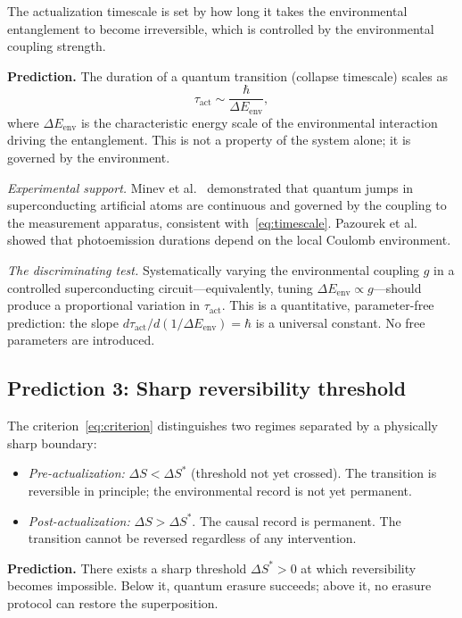 \documentclass[11pt,twocolumn]{article}
\newcommand{\tauact}{\tau_{\mathrm{act}}}
\begin{document}
The actualization timescale is set by how long it takes the
environmental entanglement to become irreversible, which is
controlled by the environmental coupling strength.

\textbf{Prediction.}
The duration of a quantum transition (collapse timescale)
scales as
\begin{equation}
  \tauact \sim \frac{\hbar}{\Delta E_{\mathrm{env}}},
  \label{eq:timescale}
\end{equation}
where $\Delta E_{\mathrm{env}}$ is the characteristic energy
scale of the environmental interaction driving the entanglement.
This is not a property of the system alone; it is governed by
the environment.

\emph{Experimental support.}
Minev et al.~\cite{Minev2019} demonstrated that quantum jumps in
superconducting artificial atoms are continuous and governed by
the coupling to the measurement apparatus, consistent
with~\eqref{eq:timescale}.
Pazourek et al.~\cite{Pazourek2015} showed that
photoemission durations depend on the local Coulomb environment.

\emph{The discriminating test.}
Systematically varying the environmental coupling $g$ in a
controlled superconducting circuit---equivalently, tuning
$\Delta E_{\mathrm{env}} \propto g$---should produce a
proportional variation in $\tauact$.
This is a quantitative, parameter-free prediction: the slope
$d\tauact / d(1/\Delta E_{\mathrm{env}}) = \hbar$ is a universal
constant. No free parameters are introduced.

\subsection{Prediction 3: Sharp reversibility threshold}

The criterion~\eqref{eq:criterion} distinguishes two regimes
separated by a physically sharp boundary:
\begin{itemize}
\item \emph{Pre-actualization:} $\Delta S < \Delta S^*$ (threshold
  not yet crossed). The transition is reversible in principle;
  the environmental record is not yet permanent.
\item \emph{Post-actualization:} $\Delta S > \Delta S^*$. The causal
  record is permanent. The transition cannot be reversed regardless
  of any intervention.
\end{itemize}

\textbf{Prediction.}
There exists a sharp threshold $\Delta S^* > 0$ at which
reversibility becomes impossible. Below it, quantum erasure
succeeds; above it, no erasure protocol can restore the
superposition.
\end{document}
